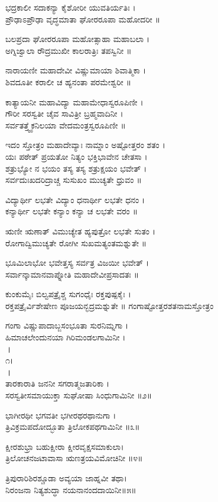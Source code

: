 ಭದ್ರಕಾಲೀ ಸದಾಕನ್ಯಾ ಕೈಶೋರೀ ಯುವತಿರ್ಯತಿಃ ।\\
ಪ್ರೌಢಾಽಪ್ರೌಢಾ ವೃದ್ಧಮಾತಾ ಘೋರರೂಪಾ ಮಹೋದರೀ ॥

ಬಲಪ್ರದಾ ಘೋರರೂಪಾ ಮಹೋತ್ಸಾಹಾ ಮಹಾಬಲಾ ।\\
ಅಗ್ನಿಜ್ವಾಲಾ ರೌದ್ರಮುಖೀ ಕಾಲರಾತ್ರಿಃ ತಪಸ್ವಿನೀ ॥

ನಾರಾಯಣೀ ಮಹಾದೇವೀ ವಿಷ್ಣುಮಾಯಾ ಶಿವಾತ್ಮಿಕಾ ।\\
ಶಿವದೂತೀ ಕರಾಲೀ ಚ ಹ್ಯನಂತಾ ಪರಮೇಶ್ವರೀ ॥

ಕಾತ್ಯಾಯನೀ ಮಹಾವಿದ್ಯಾ ಮಹಾಮೇಧಾಸ್ವರೂಪಿಣೀ ।\\
ಗೌರೀ ಸರಸ್ವತೀ ಚೈವ ಸಾವಿತ್ರೀ ಬ್ರಹ್ಮವಾದಿನೀ ।\\
ಸರ್ವತತ್ತ್ವೈಕನಿಲಯಾ ವೇದಮಂತ್ರಸ್ವರೂಪಿಣೀ ॥

ಇದಂ ಸ್ತೋತ್ರಂ ಮಹಾದೇವ್ಯಾಃ ನಾಮ್ನಾಂ ಅಷ್ಟೋತ್ತರಂ ಶತಂ ।\\
ಯಃ ಪಠೇತ್ ಪ್ರಯತೋ ನಿತ್ಯಂ ಭಕ್ತಿಭಾವೇನ ಚೇತಸಾ ।\\
ಶತ್ರುಭ್ಯೋ ನ ಭಯಂ ತಸ್ಯ ತಸ್ಯ ಶತ್ರುಕ್ಷಯಂ ಭವೇತ್ ।\\
ಸರ್ವದುಃಖದರಿದ್ರಾಚ್ಚ ಸುಸುಖಂ ಮುಚ್ಯತೇ ಧ್ರುವಂ ॥

ವಿದ್ಯಾರ್ಥೀ ಲಭತೇ ವಿದ್ಯಾಂ ಧನಾರ್ಥೀ ಲಭತೇ ಧನಂ ।\\
ಕನ್ಯಾರ್ಥೀ ಲಭತೇ ಕನ್ಯಾಂ ಕನ್ಯಾ ಚ ಲಭತೇ ವರಂ ॥

ಋಣೀ ಋಣಾತ್ ವಿಮುಚ್ಯೇತ ಹ್ಯಪುತ್ರೋ ಲಭತೇ ಸುತಂ ।\\
ರೋಗಾದ್ವಿಮುಚ್ಯತೇ ರೋಗೀ ಸುಖಮತ್ಯಂತಮಶ್ನುತೇ ॥

ಭೂಮಿಲಾಭೋ ಭವೇತ್ತಸ್ಯ ಸರ್ವತ್ರ ವಿಜಯೀ ಭವೇತ್ ।\\
ಸರ್ವಾನ್ಕಾಮಾನವಾಪ್ನೋತಿ ಮಹಾದೇವೀಪ್ರಸಾದತಃ ॥

ಕುಂಕುಮೈಃ ಬಿಲ್ವಪತ್ರೈಶ್ಚ ಸುಗಂಧೈಃ ರಕ್ತಪುಷ್ಪಕೈಃ ।\\
ರಕ್ತಪತ್ರೈರ್ವಿಶೇಷೇಣ ಪೂಜಯನ್ಭದ್ರಮಶ್ನುತೇ ॥
ಗಂಗಾಷ್ಟೋತ್ತರಶತನಾಮಸ್ತೋತ್ರಂ

ಗಂಗಾ ವಿಷ್ಣುಪಾದಾಬ್ಜಸಂಭೂತಾ ಸುರನಿಮ್ನಗಾ ।\\
ಹಿಮಾಚಲೇಂದುನಯಾ ಗಿರಿಮಂಡಲಗಾಮಿನೀ ।\\।\\೧।\\।\\

ತಾರಕಾರಾತಿ ಜನನೀ ಸಗರಾತ್ಮಜತಾರಿಕಾ ।\\
ಸರಸ್ವತೀಸಮಾಯುಕ್ತಾ ಸುಘೋಷಾ ಸಿಂಧುಗಾಮಿನೀ ॥೨॥

ಭಾಗೀರಥೀ ಭಗವತೀ ಭಗೀರಥರಥಾನುಗಾ ।\\
ತ್ರಿವಿಕ್ರಮಪದೋದ್ಭೂತಾ ತ್ರಿಲೋಕಪಥಗಾಮಿನೀ ॥೩॥

ಕ್ಷೀರಶುಭ್ರಾ ಬಹುಕ್ಷೀರಾ ಕ್ಷೀರವೃಕ್ಷಸಮಾಕುಲಾ।\\
ತ್ರಿಲೋಚನಜಟಾವಾಸಾ ಋಣತ್ರಯವಿಮೋಚಿನೀ ॥೪॥

ತ್ರಿಪುರಾರಿಶಿರಶ್ಚೂಡಾ ಅವ್ಯಯಾ ಜಾಹ್ನವೀ ತಥಾ।\\
ನಿರಂಜನಾ ನಿತ್ಯಶುದ್ಧಾ ನಯನಾನಂದದಾಯಿನೀ॥೫॥

